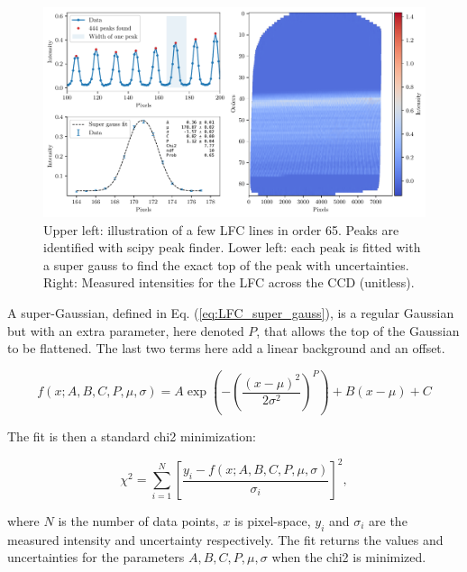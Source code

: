     \begin{figure}%
        \begin{wide}  
            \includegraphics[width=\textwidth]{figures/LFC_peak_fitting_overview.pdf}
            \caption{Upper left: illustration of a few LFC lines in order 65. Peaks are identified with scipy peak finder. Lower left: each peak is fitted with a super gauss to find the exact top of the peak with uncertainties. Right: Measured intensities for the LFC across the CCD (unitless). }
            \label{fig:LFC_CCD}
        \end{wide}
    \end{figure}

    A super-Gaussian, defined in Eq. (\ref{eq:LFC_super_gauss}), is a regular Gaussian but with an extra parameter, here denoted $P$, that allows the top of the Gaussian to be flattened. The last two terms here add a linear background and an offset.  
    
    \begin{equation}
        \label{eq:LFC_super_gauss}
        f(x ; A, B, C, P, \mu, \sigma) = A \exp \left(-\left(\frac{\left(x-\mu\right)^{2}}{2 \sigma^{2}}\right)^{P}\right) + B(x-\mu) + C
    \end{equation}

    The fit is then a standard chi2 minimization:

    \begin{equation}
        \label{eq:chi2_super_gauss}
        \chi^{2}=\sum_{i=1}^{N}\left[\frac{y_{i}-f(x ; A, B, C, P, \mu, \sigma)}{\sigma_{i}}\right]^{2},
    \end{equation}

    where $N$ is the number of data points, $x$ is pixel-space, $y_i$ and $\sigma_i$ are the measured intensity and uncertainty respectively. The fit returns the values and uncertainties for the parameters $A, B, C, P, \mu, \sigma$ when the chi2 is minimized.
    

